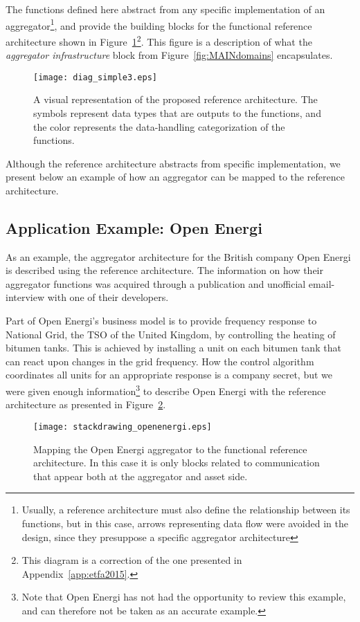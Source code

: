 The functions defined here abstract from any specific implementation of an aggregator\footnote[][-2cm]{Usually, a reference architecture must also define the relationship between its functions, but in this case, arrows representing data flow were avoided in the design, since they presuppose a specific aggregator architecture}, and provide the building blocks for the functional reference architecture shown in Figure~\ref{fig:MAINrefarch}\footnote{This diagram is a correction of the one presented in Appendix~\ref{app:etfa2015}.}. This figure is a description of what the \emph{aggregator infrastructure} block from Figure~\ref{fig:MAINdomains} encapsulates.
\begin{figure}[htbp!]
\centering
\texttt{[image: diag\_simple3.eps]}
\caption{A visual representation of the proposed reference architecture. The symbols represent data types that are outputs to the functions, and the color represents the data-handling categorization of the functions.}
\label{fig:MAINrefarch}
\end{figure}
Although the reference architecture abstracts from specific implementation, we present below an example of how an aggregator can be mapped to the reference architecture.
\subsection{Application Example: Open Energi}
As an example, the aggregator architecture for the British company Open Energi is described using the reference architecture. The information on how their aggregator functions was acquired through a publication and unofficial email-interview with one of their developers.

Part of Open Energi's business model is to provide frequency response to National Grid, the TSO of the United Kingdom, by controlling the heating of bitumen tanks. This is achieved by installing a unit on each bitumen tank that can react upon changes in the grid frequency. How the control algorithm coordinates all units for an appropriate response is a company secret, but we were given enough information\footnote[][-2em]{Note that Open Energi has not had the opportunity to review this example, and can therefore not be taken as an accurate example.} to describe Open Energi with the reference architecture as presented in Figure~\ref{fig:openenergirefarch}.

\begin{figure}[htb]
\centering
\texttt{[image: stackdrawing\_openenergi.eps]}
\caption{Mapping the Open Energi aggregator to the functional reference architecture. In this case it is only blocks related to communication that appear both at the aggregator and asset side.}
\label{fig:openenergirefarch}
\end{figure}

